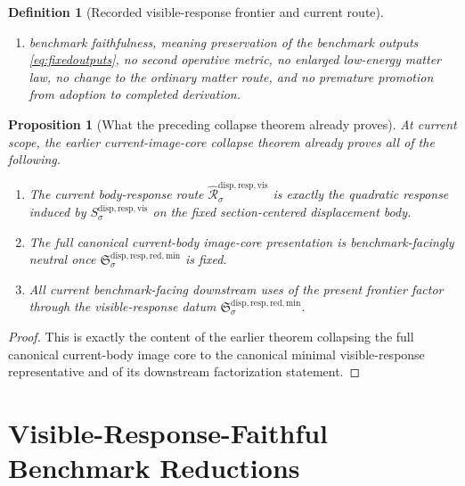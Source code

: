 \documentclass[11pt]{article}
\newcommand{\CoreForcedBodyResponse}[1]{\widehat{\mathscr R}_{#1}^{\mathrm{disp,resp,vis}}}
\newcommand{\VisibleResponseOperator}[1]{S_{#1}^{\mathrm{disp,resp,vis}}}
\newcommand{\MinimalReducedStructure}{\mathfrak S^{\mathrm{disp,resp,red,min}}}
\newcommand{\PreProtoSectionResidualPackage}{\mathfrak R^{\mathrm{sub,proto,presec,res}}}
\newcommand{\PreProtoSectionPackage}{\mathfrak R^{\mathrm{sub,proto,presec}}}
\newcommand{\PreProtoSectionMinSectionCore}{\mathfrak R^{\mathrm{sub,proto,presec,sec}}}
\newtheorem{definition}{Definition}
\newtheorem{proposition}{Proposition}
\begin{document}
\begin{definition}[Recorded visible-response frontier and current route]
\begin{enumerate}
\[\begin{aligned}
    &\PreProtoSectionResidualPackage,\quad
    \PreProtoSectionPackage,\\
    &\PreProtoSectionMinSectionCore,
    \end{aligned}
    \]
    and the current continuity-Hessian compressed core and benchmark one-metric observer package;
    \item benchmark faithfulness, meaning preservation of the benchmark outputs \eqref{eq:fixedoutputs}, no second operative metric, no enlarged low-energy matter law, no change to the ordinary matter route, and no premature promotion from adoption to completed derivation.
\end{enumerate}
\end{definition}

\begin{proposition}[What the preceding collapse theorem already proves]
\label{prop:collapse}
At current scope, the earlier current-image-core collapse theorem already proves all of the following.
\begin{enumerate}
    \item The current body-response route \(\CoreForcedBodyResponse{\sigma}\) is exactly the quadratic response induced by \(\VisibleResponseOperator{\sigma}\) on the fixed section-centered displacement body.
    \item The full canonical current-body image-core presentation is benchmark-facingly neutral once \(\MinimalReducedStructure_{\sigma}\) is fixed.
    \item All current benchmark-facing downstream uses of the present frontier factor through the visible-response datum \(\MinimalReducedStructure_{\sigma}\).
\end{enumerate}
\end{proposition}

\begin{proof}
This is exactly the content of the earlier theorem collapsing the full canonical current-body image core to the canonical minimal visible-response representative and of its downstream factorization statement.
\end{proof}

\section{Visible-Response-Faithful Benchmark Reductions}
\end{document}
